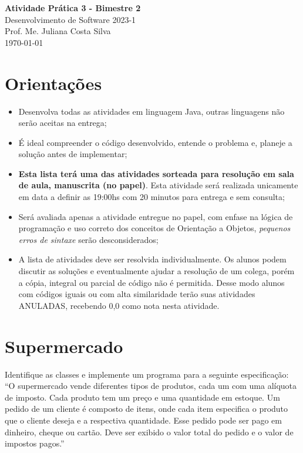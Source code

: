 \documentclass[12pt,a4paper, brazil]{article}
\begin{document}
\begin{center}
{\textbf {\huge Atividade Prática 3 - Bimestre 2}}\\[5mm]
{\large Desenvolvimento de Software 2023-1} \\
{\large Prof. Me. Juliana Costa Silva} \\
\today\\[5mm] %
\end{center}

\section*{Orientações}

\begin{itemize}
  \item Desenvolva todas as atividades em linguagem Java, outras linguagens não serão aceitas na entrega;
  \item É ideal compreender o código desenvolvido, entende o problema e, planeje a solução antes de implementar;
  \item \textbf{Esta lista terá uma das atividades sorteada para resolução em sala de aula, manuscrita (no papel)}. Esta atividade será realizada unicamente em data a definir as 19:00hs com 20 minutos para entrega e sem consulta;
  \item Será avaliada apenas a atividade entregue no papel, com enfase na lógica de programação e uso correto dos conceitos de Orientação a Objetos, \textit{pequenos erros de sintaxe} serão desconsiderados;
  \item A lista de atividades deve ser resolvida individualmente. Os alunos podem discutir as soluções e eventualmente ajudar a resolução de um colega, porém a cópia, integral ou parcial de código não é permitida. Desse modo alunos com códigos iguais ou com alta similaridade terão suas atividades ANULADAS, recebendo 0,0 como nota nesta atividade.
\end{itemize}


\vspace{0.5cm}


\section{Supermercado}
\par
Identifique as classes e implemente um programa para a seguinte especificação: “O supermercado vende diferentes tipos de produtos, cada um com uma alíquota de imposto. Cada produto tem um preço e uma quantidade em estoque. Um pedido de um cliente é composto de itens, onde cada item especifica o produto que o cliente deseja e a respectiva quantidade. Esse pedido pode ser pago em dinheiro, cheque ou cartão. Deve ser exibido o valor total do pedido e o valor de impostos pagos.”
\end{document}
